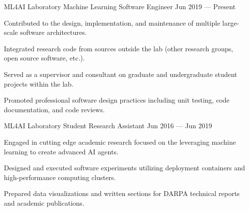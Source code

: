 
\vspace{-0.25cm}
\begin{cventries}

  \cventry
    {ML4AI Laboratory} %
    {Machine Learning Software Engineer} %
    {Jun 2019 --- Present} %
    {} %
    {
      \vspace{-0.15cm}
      \begin{cvitems} %
        \item Contributed to the design, implementation, and maintenance of multiple large-scale software architectures.
        \item Integrated research code from sources outside the lab (other research groups, open source software, etc.).
        \item Served as a supervisor and consultant on graduate and undergraduate student projects within the lab.
        \item Promoted professional software design practices including unit testing, code documentation, and code reviews.
      \end{cvitems}
    }
  \cventry
    {ML4AI Laboratory} %
    {Student Research Assistant} %
    {Jun 2016 --- Jun 2019} %
    {} %
    {
      \vspace{-0.15cm}
      \begin{cvitems} %
        \item Engaged in cutting edge academic research focused on the leveraging machine learning to create advanced AI agents.
        \item Designed and executed software experiments utilizing deployment containers and high-performance computing clusters.
        \item Prepared data visualizations and written sections for DARPA technical reports and academic publications.

\end{cvitems}}
\end{cventries}
